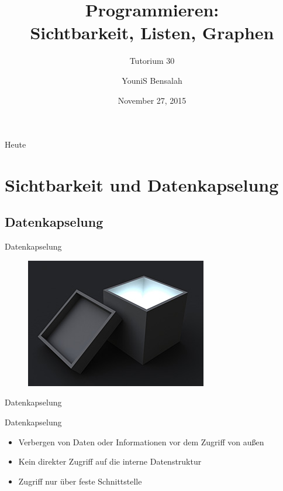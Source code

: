 \documentclass[18pt]{beamer}
\title[Sichtbarkeit, Listen, Graphen]{Programmieren:\\ Sichtbarkeit, Listen, Graphen}
\subtitle{Tutorium 30}
\author{YouniS Bensalah}
\date{November 27, 2015}
\institute{Chair for Software Design and Quality}
\begin{document}

\begin{frame}
\titlepage
\end{frame}

\begin{frame}{Heute}
\tableofcontents
\end{frame}


\section{Sichtbarkeit und Datenkapselung}

\subsection{Datenkapselung}

\begin{frame}{Datenkapselung}
    \begin{figure}
        \includegraphics[scale=3.5]{img/most_blackbox.png}
    \end{figure}
\end{frame}


\begin{frame}{Datenkapselung}
    \begin{block}{Datenkapselung}
        \begin{itemize}
            \item Verbergen von Daten oder Informationen vor dem Zugriff von außen
            \item Kein direkter Zugriff auf die interne Datenstruktur
            \item Zugriff nur über feste Schnittstelle
        \end{itemize}
    \end{block}
\end{frame}
\end{document}
